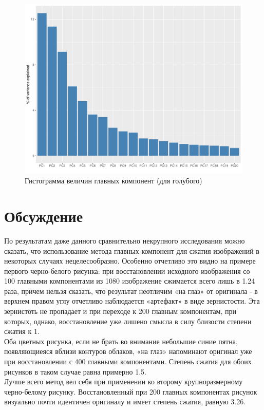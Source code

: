 \documentclass[a4paper]{article}
\begin{document}
\begin{figure}[H]
    \centering
    \includegraphics[width = \textwidth]{hists/Bluehist_for_Colosseum.pdf}
    \caption{Гистограмма величин главных компонент (для голубого)}
    \label{fig:col_b}
\end{figure}
\section{Обсуждение}
По результатам даже данного сравнительно некрупного исследования можно сказать, что использование метода главных компонент для сжатия изображений в некоторых случаях нецелесообразно. Особенно отчетливо это видно на примере первого черно-белого рисунка: при восстановлении исходного изображения со 100 главными компонентами из 1080 изображение сжимается всего лишь в 1.24 раза, причем нельзя сказать, что результат неотличим «на глаз» от оригинала - в верхнем правом углу отчетливо наблюдается «артефакт» в виде зернистости. Эта зернистоть не пропадает и при переходе к 200 главным компонентам, при которых, однако, восстановление уже лишено смысла в силу близости степени сжатия к 1.\\
Оба цветных рисунка, если не брать во внимание небольшие синие пятна, появляющиеяся вблизи контуров облаков, «на глаз» напоминают оригинал уже при восстановлении с 400 главными компонентами. Степень сжатия для обоих рисунков в таком случае равна примерно 1.5.\\
Лучше всего метод вел себя при применении ко второму крупноразмерному черно-белому рисунку. Восстановленный при 200 главных компонентах рисунок визуально почти идентичен оригиналу и имеет степень сжатия, равную 3.26.
\end{document}
